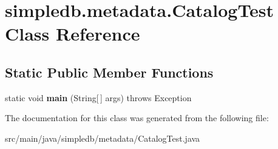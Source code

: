 \hypertarget{classsimpledb_1_1metadata_1_1CatalogTest}{}\section{simpledb.\+metadata.\+Catalog\+Test Class Reference}
\label{classsimpledb_1_1metadata_1_1CatalogTest}
\subsection*{Static Public Member Functions}
\begin{DoxyCompactItemize}
\item 
\mbox{\label{classsimpledb_1_1metadata_1_1CatalogTest_aadd9912e96a8d3646c02845569ab2947}} 
static void {\bfseries main} (String\mbox{[}$\,$\mbox{]} args)  throws Exception 
\end{DoxyCompactItemize}


The documentation for this class was generated from the following file\+:\begin{DoxyCompactItemize}
\item 
src/main/java/simpledb/metadata/Catalog\+Test.\+java\end{DoxyCompactItemize}
